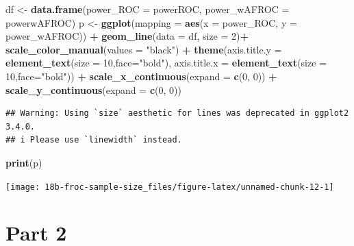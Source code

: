 \documentclass[
]{book}
\newenvironment{Shaded}{\begin{snugshade}}{\end{snugshade}}
\newcommand{\DataTypeTok}[1]{\textcolor[rgb]{0.13,0.29,0.53}{#1}}
\newcommand{\DecValTok}[1]{\textcolor[rgb]{0.00,0.00,0.81}{#1}}
\newcommand{\KeywordTok}[1]{\textcolor[rgb]{0.13,0.29,0.53}{\textbf{#1}}}
\newcommand{\NormalTok}[1]{#1}
\newcommand{\OperatorTok}[1]{\textcolor[rgb]{0.81,0.36,0.00}{\textbf{#1}}}
\newcommand{\StringTok}[1]{\textcolor[rgb]{0.31,0.60,0.02}{#1}}
\begin{document}
\begin{Shaded}
\begin{Highlighting}[]
\NormalTok{df <-}\StringTok{ }\KeywordTok{data.frame}\NormalTok{(}\DataTypeTok{power_ROC =}\NormalTok{ powerROC, }\DataTypeTok{power_wAFROC =}\NormalTok{ powerwAFROC)}
\NormalTok{p <-}\StringTok{ }\KeywordTok{ggplot}\NormalTok{(}\DataTypeTok{mapping =} \KeywordTok{aes}\NormalTok{(}\DataTypeTok{x =}\NormalTok{ power_ROC, }\DataTypeTok{y =}\NormalTok{ power_wAFROC)) }\OperatorTok{+}
\StringTok{  }\KeywordTok{geom_line}\NormalTok{(}\DataTypeTok{data =}\NormalTok{ df, }\DataTypeTok{size =} \DecValTok{2}\NormalTok{)}\OperatorTok{+}
\StringTok{  }\KeywordTok{scale_color_manual}\NormalTok{(}\DataTypeTok{values =} \StringTok{"black"}\NormalTok{) }\OperatorTok{+}\StringTok{ }
\StringTok{  }\KeywordTok{theme}\NormalTok{(}\DataTypeTok{axis.title.y =} \KeywordTok{element_text}\NormalTok{(}\DataTypeTok{size =} \DecValTok{10}\NormalTok{,}\DataTypeTok{face=}\StringTok{"bold"}\NormalTok{),}
        \DataTypeTok{axis.title.x =} \KeywordTok{element_text}\NormalTok{(}\DataTypeTok{size =} \DecValTok{10}\NormalTok{,}\DataTypeTok{face=}\StringTok{"bold"}\NormalTok{))  }\OperatorTok{+}
\StringTok{  }\KeywordTok{scale_x_continuous}\NormalTok{(}\DataTypeTok{expand =} \KeywordTok{c}\NormalTok{(}\DecValTok{0}\NormalTok{, }\DecValTok{0}\NormalTok{)) }\OperatorTok{+}\StringTok{ }
\StringTok{  }\KeywordTok{scale_y_continuous}\NormalTok{(}\DataTypeTok{expand =} \KeywordTok{c}\NormalTok{(}\DecValTok{0}\NormalTok{, }\DecValTok{0}\NormalTok{))}
\end{Highlighting}
\end{Shaded}

\begin{verbatim}
## Warning: Using `size` aesthetic for lines was deprecated in ggplot2 3.4.0.
## i Please use `linewidth` instead.
\end{verbatim}

\begin{Shaded}
\begin{Highlighting}[]
\KeywordTok{print}\NormalTok{(p)}
\end{Highlighting}
\end{Shaded}

\begin{center}\texttt{[image: 18b-froc-sample-size\_files/figure-latex/unnamed-chunk-12-1]} \end{center}

\hypertarget{part-2}{%
\section{Part 2}\label{part-2}}
\end{document}
